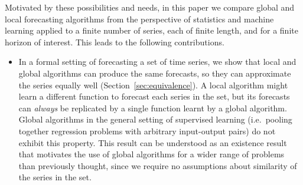 \documentclass[a4paper]{article}
\theoremstyle{custom}
\begin{document}
Motivated by these possibilities and needs, in this paper we compare global and local forecasting algorithms from the perspective of statistics and machine learning applied to a finite number of series, each of finite length, and for a finite horizon of interest. This leads to the following contributions.

\begin{itemize}
\item In a formal setting of forecasting a set of time series, we show that local and global algorithms can produce the same forecasts, so they can approximate the series equally well (Section~\ref{sec:equivalence}).
A local algorithm might learn a different function to forecast each series in the set, but its forecasts can \textit{always} be replicated by a single function learnt by a global algorithm.
Global algorithms in the general setting of supervised learning (i.e.\ pooling together regression problems with arbitrary input-output pairs) do not exhibit this property.
This result can be understood as an existence result that motivates the use of global algorithms for a wider range of problems than previously thought, since we require no assumptions about similarity of the series in the set.


\end{itemize}
\end{document}
